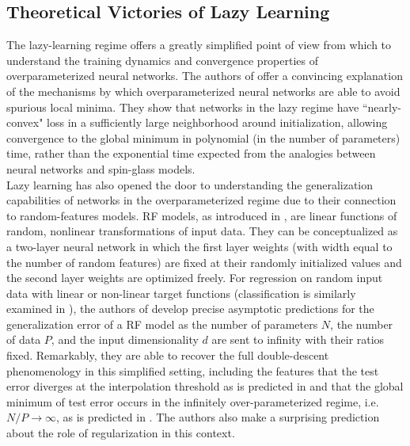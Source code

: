 \documentclass[a4paper, 12pt]{article}
\begin{document}
\subsection{Theoretical Victories of Lazy Learning}

The lazy-learning regime offers a greatly simplified point of view from which to understand the training dynamics and convergence properties of overparameterized neural networks. The authors of \cite{allen-zhuConvergenceTheoryDeep2019} offer a convincing explanation of the mechanisms by which overparameterized neural networks are able to avoid spurious local minima. They show that networks in the lazy regime have ``nearly-convex" loss in a sufficiently large neighborhood around initialization, allowing convergence to the global minimum in polynomial (in the number of parameters) time, rather than the exponential time expected from the analogies between neural networks and spin-glass models.\\

Lazy learning has also opened the door to understanding the generalization capabilities of networks in the overparameterized regime due to their connection to random-features models. RF models, as introduced in \cite{rahimiRandomFeaturesLargeScale2008}, are linear functions of random, nonlinear transformations of input data. They can be conceptualized as a two-layer neural network in which the first layer weights (with width equal to the number of random features) are fixed at their randomly initialized values and the second layer weights are optimized freely. For regression on random input data with linear or non-linear target functions (classification is similarly examined in \cite{deng2019model}), the authors of  \cite{meiGeneralizationErrorRandom2019} develop precise asymptotic predictions for the generalization error of a RF model as the number of parameters $N$, the number of data $P$, and the input dimensionality $d$ are sent to infinity with their ratios fixed. Remarkably, they are able to recover the full double-descent phenomenology in this simplified setting, including the features that the test error diverges at the interpolation threshold as is predicted in \cite{geigerScalingDescriptionGeneralization2019} and that the global minimum of test error occurs in the infinitely over-parameterized regime, i.e. $N/P\rightarrow\infty$, as is predicted in . The authors also make a surprising prediction about the role of regularization in this context. \\
\end{document}
